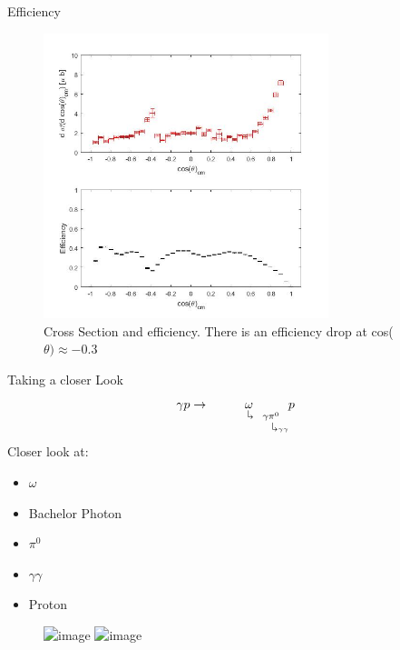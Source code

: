 \documentclass[
		10pt
		]{beamer}
\begin{document}
\begin{frame}{Efficiency}
	\centering
	\begin{figure}
		\includegraphics[width=8.3cm]{Plots/4}
		\captionsetup{labelformat=empty}
		\caption{Cross Section and efficiency. There is an efficiency drop at cos($\theta) \approx -0.3$}
	\end{figure}
\end{frame}

\begin{frame}{Taking a closer Look}
	\begin{equation*}
\gamma  p \rightarrow \underset{ \hspace{1.05cm}\rotatebox[origin=c]{180}{$\Lsh$}{\underset{\hspace{0.5cm}\rotatebox[origin=c]{180}{$\Lsh$} \gamma \gamma 	}{\gamma \pi^0}}}{\omega} p 
	\end{equation*}
	Closer look at:
	
	\begin{multicols}{3}
		
		\begin{itemize}
			
			\item $\omega$
			\item Bachelor Photon
			\item $\pi^0$
			\item $\gamma \gamma$
			\item Proton
			
		\end{itemize}
	\end{multicols}

\begin{figure}
	\centering
	\captionsetup{labelformat=empty}
	\includegraphics<1>[width=8.3cm]{Plots/5}
	\includegraphics<2>[width=8.3cm]{Plots/8}
\end{figure}



\end{frame}
\end{document}
